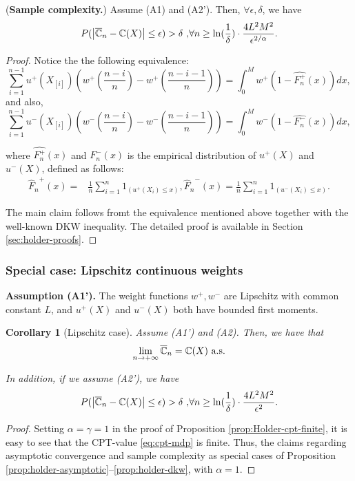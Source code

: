 \documentclass[11pt,letterpaper,english]{article}
\newtheorem{corollary}[theorem]{Corollary}
\begin{document}
\begin{proposition}(\textbf{Sample complexity.})
\label{prop:holder-dkw}
Assume (A1) and (A2'). Then, $\forall \epsilon, \delta$, we have
$$
P(\left |\overline {\mathbb{C}}_n- \mathbb{C}(X) \right| \leq  \epsilon ) > \delta\text{     ,} \forall n \geq \ln(\frac{1}{\delta})\cdot 
\frac{4L^2 M^2}{\epsilon^{2/\alpha}}.$$
\end{proposition}
\begin{proof}
Notice the the following equivalence:
$$\sum_{i=1}^{n-1} u^+(X_{[i]}) (w^+(\frac{n-i}{n}) - w^+(\frac{n-i-1}{n})) =  \int_0^M w^+(1-\hat{F^+_n}(x)) dx, $$
and also,
$$\sum_{i=1}^{n-1} u^-(X_{[i]}) (w^-(\frac{n-i}{n}) - w^-(\frac{n-i-1}{n})) =  \int_0^M w^-(1-\hat{F^-_n}(x)) dx, $$

where $\hat{F^+_n}(x)$ and $\hat{F^-_n}(x)$ is the empirical distribution of $u^+(X)$
and $u^-(X)$, defined as follows:
\begin{align}
{\hat F_n}^+(x)=&\frac{1}{n} \sum_{i=1}^n 1_{(u^+(X_i) \leq x)}, 
{\hat F_n}^-(x)=\frac{1}{n} \sum_{i=1}^n 1_{(u^-(X_i) \leq x)}.
\label{eq:edf}
\end{align}

The main claim follows fromt the equivalence mentioned above together with the well-known DKW inequality.
The detailed proof is available in Section \ref{sec:holder-proofs}.
\end{proof}

\subsubsection*{Special case: Lipschitz continuous weights}
\textbf{Assumption (A1').}  The weight functions $w^+, w^-$ are Lipschitz with common constant $L$, and 
$u^+(X)$ and $u^-(X)$ both have bounded first moments.\\[1ex]

\begin{corollary}[Lipschitz case]
Assume (A1') and (A2). Then, we have that 
$$\lim_{n\rightarrow +\infty} \overline {\mathbb{C}}_n = \mathbb{C}(X) \text{   a.s.}$$

In addition, if we assume (A2'), we have 
$$
P(\left |\overline {\mathbb{C}}_n- \mathbb{C}(X) \right| \leq  \epsilon ) > \delta\text{     ,} \forall n \geq \ln(\frac{1}{\delta})\cdot 
\frac{4L^2 M^2}{\epsilon^{2}}.
$$
\end{corollary}
\begin{proof}
 Setting $\alpha=\gamma=1$ in the proof of Proposition \ref{prop:Holder-cpt-finite}, it is easy to see that the CPT-value \eqref{eq:cpt-mdp} is finite. Thus, the claims regarding asymptotic convergence and sample complexity as special cases of Proposition \ref{prop:holder-asymptotic}--\ref{prop:holder-dkw}, with $\alpha=1$. 
\end{proof}
\end{document}
